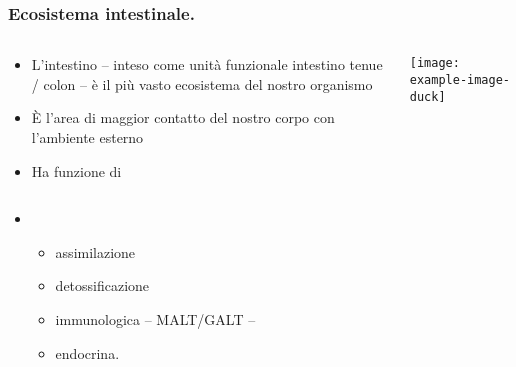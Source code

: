 \documentclass{beamer}
\begin{document}
\begin{frame}
    \frametitle{Ecosistema intestinale.}
  \begin{columns}[onlytextwidth]
      \begin{column}{.65\linewidth}
        \begin{itemize}
            \item L’intestino – inteso come unità funzionale intestino tenue / colon – è il più vasto ecosistema del nostro organismo
            \item È l’area di maggior contatto del nostro corpo con l’ambiente esterno
            \item Ha funzione di
        \end{itemize} 
      \end{column}
      \begin{column}{.3\linewidth}
        \texttt{[image: example-image-duck]}
      \end{column} 
  \end{columns}
    \smallskip
    \begin{itemize}
    \item[]
    \begin{itemize}
       \item assimilazione
       \item detossificazione
       \item immunologica – MALT/GALT –  
       \item endocrina.
    \end{itemize}
    \end{itemize} 
\end{frame}
\end{document}
